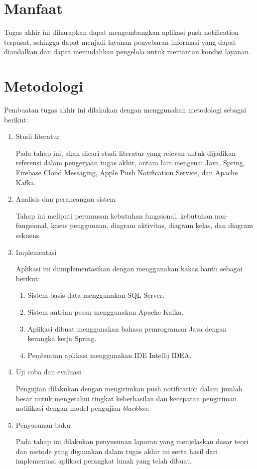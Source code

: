 \section{Manfaat}
\par Tugas akhir ini diharapkan dapat mengembangkan aplikasi push notification terpusat, sehingga dapat menjadi layanan penyebaran informasi yang dapat diandalkan dan dapat memudahkan pengelola untuk memantau kondisi layanan.

\section {Metodologi}
\par Pembuatan tugas akhir ini dilakukan dengan menggunakan metodologi sebagai berikut:
\begin{enumerate}[listparindent=2.5em]
	\item Studi literatur
	\par Pada tahap ini, akan dicari studi literatur yang relevan untuk dijadikan referensi dalam pengerjaan tugas akhir, antara lain mengenai Java, Spring, Firebase Cloud Messaging, Apple Push Notification Service, dan Apache Kafka.
	\item Analisis dan perancangan sistem
	\par Tahap ini meliputi perumusan kebutuhan fungsional, kebutuhan non-fungsional, kasus penggunaan, diagram aktivitas, diagram kelas, dan diagram sekuens.
	\item Implementasi
	\par Aplikasi ini diimplementasikan dengan menggunakan kakas bantu sebagai berikut:
	\begin{enumerate}
		\item Sistem basis data menggunakan SQL Server.
		\item Sistem antrian pesan menggunakan Apache Kafka.
		\item Aplikasi dibuat menggunakan bahasa pemrograman Java dengan kerangka kerja Spring.
		\item Pembuatan aplikasi menggunakan IDE Intellij IDEA.
	\end{enumerate}
    \item Uji coba dan evaluasi
    \par Pengujian dilakukan dengan mengirimkan push notification dalam jumlah besar untuk mengetahui tingkat keberhasilan dan kecepatan pengiriman notifikasi dengan model pengujian \textit{blackbox}.
    \item Penyusunan buku
    \par Pada tahap ini dilakukan penyusunan laporan yang menjelaskan dasar teori dan metode yang digunakan dalam tugas akhir ini serta hasil dari implementasi aplikasi perangkat lunak yang telah dibuat.
\end{enumerate}

